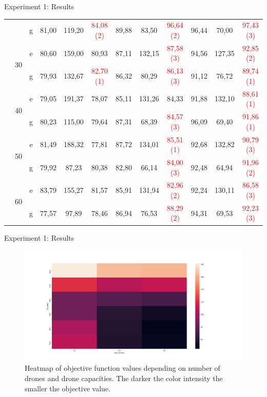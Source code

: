 \documentclass[slidestop,usepdftitle=false,10pt]{beamer}
\begin{document}
\begin{frame}{Experiment 1: Results}
\begin{table}
{\begin{tabular}{|c|c|c|c c c c c c c c c|}
        &  & g & 81,00 & 119,20 & \textcolor{red}{84,08 (2)} & 89,88 & 83,50 & \textcolor{red}{96,64 (2)} & 96,44 & 70,00 & \textcolor{red}{97,43 (3)}\\
        \cline{2-12}
        & \multirow{2}{*}{30} & e & 80,60 &	159,00 & 80,93 & 87,11 & 132,15 & \textcolor{red}{87,58 (3)} &	94,56 &	127,35 & \textcolor{red}{92,85 (2)}\\
        & & g & 79,93 &	132,67 & \textcolor{red}{82,70 (1)} & 86,32 & 80,29 & \textcolor{red}{86,13 (3)} & 91,12 &	76,72 &	\textcolor{red}{89,74 (1)}\\
        \cline{2-12}
        & \multirow{2}{*}{40} & e & 79,05 &	191,37 & 78,07 & 85,11 & 131,26 &	84,33 &	91,88 &	132,10 & \textcolor{red}{88,61 (1)}\\
        & & g & 80,23 &	115,00 & 79,64 & 87,31 & 68,39 & \textcolor{red}{84,57 (3)} & 96,09 &	69,40 &	\textcolor{red}{91,86 (1)}\\
        \cline{2-12}
        & \multirow{2}{*}{50} & e & 81,49 &	188,32 & 77,81 & 87,72 & 134,01 &	\textcolor{red}{85,51 (1)} &	92,68 &	132,82 & \textcolor{red}{90,79 (3)}\\
        & & g & 79,92 &	87,23 &	80,38 &	82,80 &	66,14 &	\textcolor{red}{84,00 (3)} &	92,48 &	64,94 &	\textcolor{red}{91,96 (2)}\\
        \cline{2-12}
        & \multirow{2}{*}{60} & e & 83,79 &	155,27 & 81,57 & 85,91 & 131,94 &	\textcolor{red}{82,96 (2)} &	92,24 &	130,11 & \textcolor{red}{86,58 (3)}\\
        & & g & 77,57 &	97,89 &	78,46 &	86,94 &	76,53 &	\textcolor{red}{88,29 (2)} &	94,31 &	69,53 &	\textcolor{red}{92,23 (3)}\\
        \hline
        \end{tabular}}
        \label{table:tab2}
        \end{table}
	\end{frame}
	
	\begin{frame}{Experiment 1: Results}
	    \begin{figure}[h!]
        \includegraphics[width=\linewidth]{heatmap.png}
        \caption{Heatmap of objective function values depending on number of drones and drone capacities. The darker the color intensity the smaller the objective value. \label{fig:heatmap}}
        \end{figure}
	\end{frame}
\end{document}
